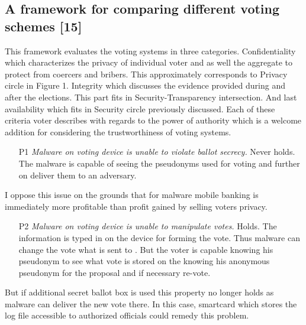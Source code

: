 \documentclass[12pt,a4paper]{article}
\let\Oldsubsection\subsection
\renewcommand{\subsection}{\FloatBarrier\Oldsubsection}
\renewcommand{\texttt}[1]{\jlinl{#1}}
\begin{document}
\subsection{A framework for comparing different voting schemes [15]}
This framework evaluates the voting systems in three categories. Confidentiality which characterizes the privacy of individual voter and as well the aggregate to protect from coercers and bribers. This approximately corresponds to Privacy circle in Figure 1. Integrity which discusses the evidence provided during and after the elections. This part fits in Security-Transparency intersection. And last availability which fits in Security circle previously discussed. Each of these criteria voter describes with regards to the power of authority which is a welcome addition for considering the trustworthiness of voting systems.\par
\begin{itemize}
\setlength{\itemsep}{0pt}
\setlength{\parskip}{0pt}
\item
[P1] \textit{Malware on voting device is unable to violate ballot secrecy.} Never holds. The malware is capable of seeing the pseudonyms used for voting and further on deliver them to an adversary.\par
\end{itemize}
I oppose this issue on the grounds that for malware mobile banking is immediately more profitable than profit gained by selling voters privacy.\par
\begin{itemize}
\setlength{\itemsep}{0pt}
\setlength{\parskip}{0pt}
\item
[P2] \textit{Malware on voting device is unable to manipulate votes.} Holds. The information is typed in on the device for forming the vote. Thus malware can change the vote what is sent to \texttt{BraidChain}. But the voter is capable knowing his pseudonym to see what vote is stored on the \texttt{BraidChain} knowing his anonymous pseudonym for the proposal and if necessary re-vote.\par
\end{itemize}
But if additional secret ballot box is used this property no longer holds as malware can deliver the new vote there. In this case, smartcard which stores the log file accessible to authorized officials could remedy this problem.\par
\end{document}
